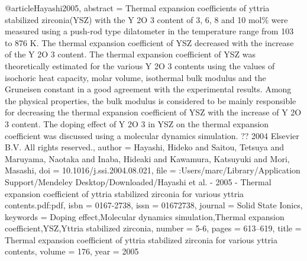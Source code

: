 @article{Hayashi2005,
abstract = {Thermal expansion coefficients of yttria stabilized zirconia(YSZ) with the Y 2O 3 content of 3, 6, 8 and 10 mol{\%} were measured using a push-rod type dilatometer in the temperature range from 103 to 876 K. The thermal expansion coefficient of YSZ decreased with the increase of the Y 2O 3 content. The thermal expansion coefficient of YSZ was theoretically estimated for the various Y 2O 3 contents using the values of isochoric heat capacity, molar volume, isothermal bulk modulus and the Gruneisen constant in a good agreement with the experimental results. Among the physical properties, the bulk modulus is considered to be mainly responsible for decreasing the thermal expansion coefficient of YSZ with the increase of Y 2O 3 content. The doping effect of Y 2O 3 in YSZ on the thermal expansion coefficient was discussed using a molecular dynamics simulation. ?? 2004 Elsevier B.V. All rights reserved.},
author = {Hayashi, Hideko and Saitou, Tetsuya and Maruyama, Naotaka and Inaba, Hideaki and Kawamura, Katsuyuki and Mori, Masashi},
doi = {10.1016/j.ssi.2004.08.021},
file = {:Users/marc/Library/Application Support/Mendeley Desktop/Downloaded/Hayashi et al. - 2005 - Thermal expansion coefficient of yttria stabilized zirconia for various yttria contents.pdf:pdf},
isbn = {0167-2738},
issn = {01672738},
journal = {Solid State Ionics},
keywords = {Doping effect,Molecular dynamics simulation,Thermal expansion coefficient,YSZ,Yttria stabilized zirconia},
number = {5-6},
pages = {613--619},
title = {{Thermal expansion coefficient of yttria stabilized zirconia for various yttria contents}},
volume = {176},
year = {2005}
}

